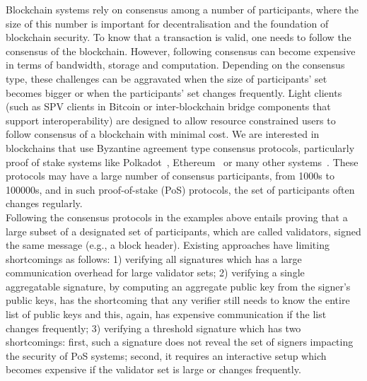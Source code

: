 Blockchain systems rely on consensus among a number of participants, where the size of this number is important for decentralisation and the foundation of blockchain security. To know that a transaction is valid, one needs to follow the consensus of the blockchain. However, following consensus can become expensive in
terms of bandwidth, storage and computation. Depending on the consensus type, these challenges can be aggravated when the size of participants' set becomes bigger or when the participants' set changes frequently. Light clients (such as SPV clients in Bitcoin \cite{nakamoto2008bitcoin} or inter-blockchain bridge components that support interoperability) are designed to allow resource constrained users to follow consensus of a blockchain with
minimal cost. We are interested in blockchains that use Byzantine agreement type consensus protocols, particularly proof of stake systems
like Polkadot~\cite{polkadot}, Ethereum~\cite{ethereum}
or many other systems~\cite{cosmos,tendermint_paper,celo}. These protocols
may have a large number of consensus participants, from 1000s to 100000s, and in such proof-of-stake (PoS) protocols, the set of participants often changes regularly. \\

\vspace{-0.2cm}
\noindent Following the consensus protocols in the examples above entails proving that a large subset of a designated set of participants,
which are called validators, signed the same message (e.g., a block header). Existing approaches have limiting shortcomings as follows:
1) verifying all signatures which has a large communication overhead for large validator sets;
2) verifying a single aggregatable signature, by computing an aggregate public key from the signer's public keys, has the shortcoming that any verifier still needs to know the entire list of public keys and this, again, has expensive communication if the list changes frequently;
3) verifying a threshold signature which has two shortcomings: first, such a signature does not reveal the set of signers impacting the
security of PoS systems; second, it requires an interactive setup which becomes expensive if the validator set is large or changes frequently.

\vspace{-0.2cm}
